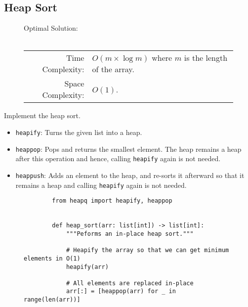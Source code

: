 
\subsection{Heap Sort}

\begin{figure}[H]
    Optimal Solution:\\\\
    \begin{tabular}{rl}
        Time Complexity:& \(O(m \times \log{m})\) where \(m\) is the length of
        the array.\\
        Space Complexity:& \(O(1)\).
    \end{tabular}
\end{figure}

Implement the heap sort.

\begin{itemize}
    \item \texttt{heapify}: Turns the given list into a heap.

    \item \texttt{heappop}: Pops and returns the smallest element.
        The heap remains a heap after this operation and hence, calling
        \texttt{heapify} again is not needed.

    \item \texttt{heappush}: Adds an element to the heap, and
        re-sorts it afterward so that it remains a heap and calling
        \texttt{heapify} again is not needed.
\end{itemize}

\begin{figure}[H]
    \centering
    \begin{verbatim}
        from heapq import heapify, heappop


        def heap_sort(arr: list[int]) -> list[int]:
            """Peforms an in-place heap sort."""

            # Heapify the array so that we can get minimum elements in O(1)
            heapify(arr)

            # All elements are replaced in-place
            arr[:] = [heappop(arr) for _ in range(len(arr))]
    \end{verbatim}
\end{figure}
